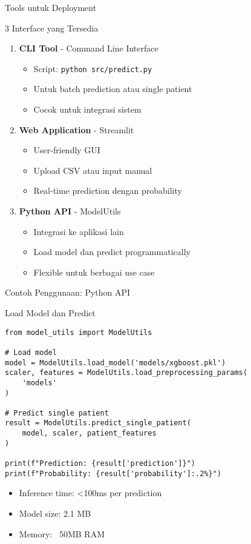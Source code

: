 \documentclass[aspectratio=169]{beamer}
\begin{document}
\begin{frame}{Tools untuk Deployment}
\begin{block}{3 Interface yang Tersedia}
\begin{enumerate}
    \item \textbf{CLI Tool} - Command Line Interface
    \begin{itemize}
        \item Script: \texttt{python src/predict.py}
        \item Untuk batch prediction atau single patient
        \item Cocok untuk integrasi sistem
    \end{itemize}
    
    \item \textbf{Web Application} - Streamlit
    \begin{itemize}
        \item User-friendly GUI
        \item Upload CSV atau input manual
        \item Real-time prediction dengan probability
    \end{itemize}
    
    \item \textbf{Python API} - ModelUtils
    \begin{itemize}
        \item Integrasi ke aplikasi lain
        \item Load model dan predict programmatically
        \item Flexible untuk berbagai use case
    \end{itemize}
\end{enumerate}
\end{block}
\end{frame}

\begin{frame}[fragile]{Contoh Penggunaan: Python API}
\begin{block}{Load Model dan Predict}
\begin{verbatim}
from model_utils import ModelUtils

# Load model
model = ModelUtils.load_model('models/xgboost.pkl')
scaler, features = ModelUtils.load_preprocessing_params(
    'models'
)

# Predict single patient
result = ModelUtils.predict_single_patient(
    model, scaler, patient_features
)

print(f"Prediction: {result['prediction']}")
print(f"Probability: {result['probability']:.2%}")
\end{verbatim}
\end{block}

\begin{itemize}
    \item Inference time: <100ms per prediction
    \item Model size: 2.1 MB
    \item Memory: ~50MB RAM
\end{itemize}
\end{frame}
\end{document}
